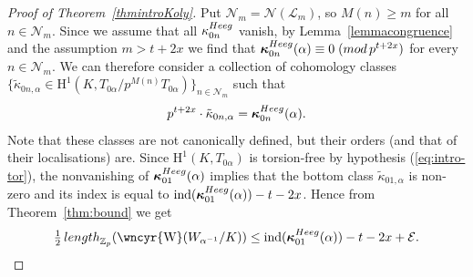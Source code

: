 \documentclass[10pt,reqno]{amsart}
\numberwithin{equation}{section}
\theoremstyle{plain}
\theoremstyle{definition}
\theoremstyle{definition}
\theoremstyle{plain}
\theoremstyle{plain}
\newtheorem{lemma}[thm]{Lemma}
\theoremstyle{plain}
\theoremstyle{plain}
\theoremstyle{plain}
\theoremstyle{plain}
\newcommand{\ind}{\operatorname{ind}}
\newcommand{\Z}{\mathbb{Z}}
\newcommand{\bkappa}{\boldsymbol{\kappa}}
\newcommand{\sha}{\text{\wncyr{W}}}
\newcommand{\CE}{\mathcal{E}}
\newcommand{\Fcal}{\mathcal{F}}
\newcommand{\cN}{\mathcal{N}}
\newcommand{\rH}{\mathrm{H}}
\begin{document}
\begin{proof}[Proof of Theorem~\ref{thmintroKoly}]
Put $\mathcal{N}_m=\mathcal{N}(\mathcal{L}_m)$, 
so $M(n)\geq m$ for all $n\in\cN_m$. Since we assume that all $\kappa_{0n}^{\rm Heeg}$ vanish, by Lemma~\ref{lemmacongruence} and the assumption $m>t+2x$ we find that $\bkappa_{0n}^{\rm Heeg}(\alpha)\equiv 0\;({\rm mod}\,p^{t+2x})$ for every $n\in\mathcal{N}_m$. We can therefore consider a collection of cohomology classes $\{\tilde{\kappa}_{0n,\alpha}\in\rH^1(K,T_{0\alpha}/p^{M(n)}T_{0\alpha})\}_{n\in\mathcal{N}_m}$ such that
\[
p^{t+2x}\cdot\tilde{\kappa}_{0n,\alpha}=\bkappa_{0n}^{\rm Heeg}(\alpha).
\] 
Note that these classes are not canonically defined, but their orders (and that of their localisations) are.
Since $\rH^1(K,T_{0\alpha})$ is torsion-free by hypothesis (\ref{eq:intro-tor}), the nonvanishing of $\bkappa_{01}^{\rm Heeg}(\alpha)$ implies that the bottom class $\tilde{\kappa}_{01,\alpha}$ is non-zero and its index is equal to $\ind(\bkappa_{01}^{\rm Heeg}(\alpha))-t-2x$. Hence from Theorem~\ref{thm:bound} we get
\begin{equation}\label{eq:boundalpha-t}
\tfrac{1}{2}\,{\rm length}_{\Z_p}(\sha(W_{\alpha^{-1}}/K))\leq \ind(\bkappa_{01}^{\rm Heeg}(\alpha)) -t-2x +\CE.
\end{equation}




\end{proof}
\end{document}
